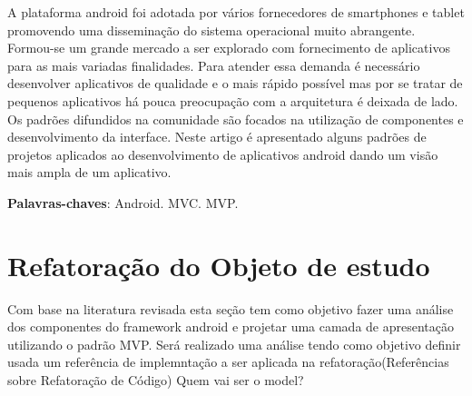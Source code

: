 \documentclass[
	12pt,				%
	openright,			%
	twoside,			%
	a4paper,			%
	english,			%
	french,				%
	spanish,			%
	brazil,				%
	]{abntex2}
\begin{document}
\frenchspacing 



\imprimirfolhaderosto*


\begin{resumo}
 A plataforma android foi adotada por vários fornecedores de smartphones e tablet promovendo uma disseminação 
 do sistema operacional muito abrangente. Formou-se um grande mercado a ser explorado com fornecimento de 
 aplicativos para as  mais variadas finalidades. Para atender essa demanda é necessário desenvolver aplicativos 
 de qualidade e o mais rápido possível mas por se tratar de pequenos  aplicativos há pouca preocupação com a 
 arquitetura é deixada de lado. Os padrões difundidos na comunidade são focados na utilização de componentes e 
 desenvolvimento da interface. Neste artigo é apresentado alguns padrões de projetos  aplicados ao desenvolvimento 
 de aplicativos android dando um visão mais ampla de um aplicativo. 

 \vspace{\onelineskip}
    
 \noindent
 \textbf{Palavras-chaves}: Android. MVC. MVP.
\end{resumo}

\tableofcontents*
\cleardoublepage

\textual






\section{Refatoração do Objeto de estudo}

Com base na literatura revisada esta seção tem como objetivo fazer uma análise
dos componentes do framework android e projetar uma camada de apresentação
utilizando o padrão MVP. Será realizado uma análise  tendo como objetivo definir
usada um referência de implemntação a ser aplicada na refatoração(Referências
sobre Refatoração de Código)
Quem vai ser o model?
\end{document}
